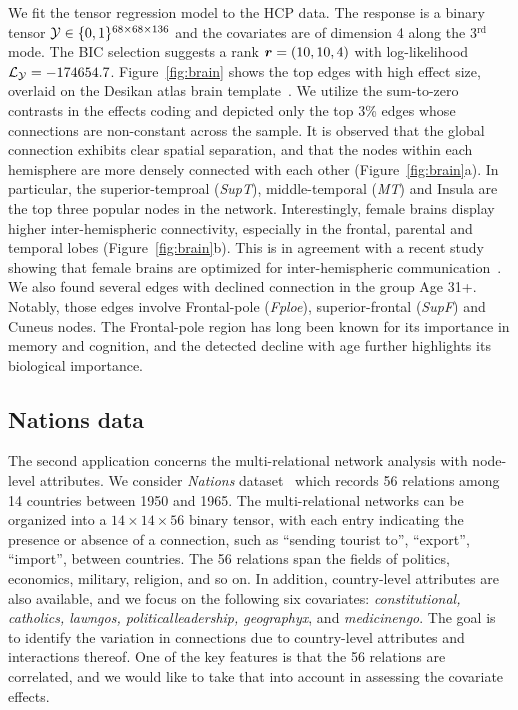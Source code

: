 \documentclass[12pt]{article}
\theoremstyle{plain}
\theoremstyle{definition}
\begin{document}
We fit the tensor regression model to the HCP data. The response is a binary tensor $\mathcal{Y}\in\{0,1\}^{68\times 68\times 136}$ and the covariates are of dimension 4 along the 3$^{\text{rd}}$ mode. The BIC selection suggests a rank $\bm{r}=(10,10,4)$ with log-likelihood $\mathcal{L}_{\mathcal{Y}}=-174654.7$. Figure~\ref{fig:brain} shows the top edges with high effect size, overlaid on the Desikan atlas brain template~\citep{desikan2006automated,xia2013brainnet}. We utilize the sum-to-zero contrasts in the effects coding and depicted only the top 3\% edges whose connections are non-constant across the sample. It is observed that the global connection exhibits clear spatial separation, and that the nodes within each hemisphere are more densely connected with each other (Figure~\ref{fig:brain}a). In particular, the superior-temproal (\emph{SupT}), middle-temporal (\emph{MT}) and Insula are the top three popular nodes in the network. Interestingly, female brains display higher inter-hemispheric connectivity, especially in the frontal, parental and temporal lobes (Figure~\ref{fig:brain}b). This is in agreement with a recent study showing that female brains are optimized for inter-hemispheric communication~\citep{ingalhalikar2014sex}. We also found several edges with declined connection in the group Age 31+. Notably, those edges involve Frontal-pole (\emph{Fploe}), superior-frontal (\emph{SupF}) and Cuneus nodes. The Frontal-pole region has long been known for its importance in memory and cognition, and the detected decline with age further highlights its biological importance. 

\subsection{Nations data}

The second application concerns the multi-relational network analysis with node-level attributes. We consider \emph{Nations} dataset~\citep{nickel2011three} which records 56 relations among 14 countries between 1950 and 1965. The multi-relational networks can be organized into a $14 \times 14 \times 56$ binary tensor, with each entry indicating the presence or absence of a connection, such as ``sending tourist to'', ``export'', ``import'', between countries. The 56 relations span the fields of politics, economics, military, religion, and so on. In addition, country-level attributes are also available, and we focus on the following six covariates: \emph{constitutional, catholics, lawngos, politicalleadership, geographyx}, and \emph{medicinengo}. The goal is to identify the variation in connections due to country-level attributes and interactions thereof. One of the key features is that the 56 relations are correlated, and we would like to take that into account in assessing the covariate effects. 
\end{document}
